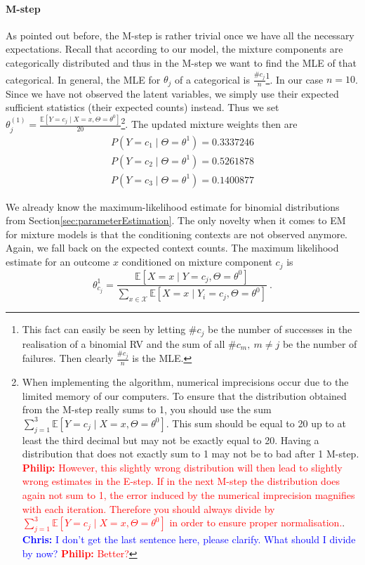 \documentclass[a4paper,11pt,leqno]{report}\usepackage[]{graphicx}\usepackage[]{color}
\newcommand{\E}{\mathbb{E}}
\newcommand{\philip}[1]{ \textcolor{red}{\textbf{Philip:} #1}}
\newcommand{\chris}[1]{ \textcolor{blue}{\textbf{Chris:} #1}}
\begin{document}
\paragraph{M-step} As pointed out before, the M-step is rather trivial once we have all the necessary expectations. Recall that according to our model, 
the mixture components are categorically
distributed and thus in the M-step we want to find the MLE of that categorical. In general, the MLE for $ \theta_{j} $ of a categorical is
$ \frac{\#c_{j}}{n} $\footnote{This fact can easily be seen by letting $ \#c_{j} $ be the number of successes in the realisation of a binomial RV and the sum of all
$ \#c_{m},~m \not = j $ be the number of failures. Then clearly $ \frac{\#c_{j}}{n} $ is the MLE.}. In our case $ n=10 $. Since we have not observed the
latent variables, we simply use their expected sufficient statistics (their expected counts) instead. Thus we set 
$ \theta_{j}^{(1)} = \frac{\E[Y = c_{j} \mid X=x,\Theta= \theta^{0}]}{20} $\footnote{When implementing the algorithm, numerical imprecisions occur due to the limited
memory of our computers. To ensure that the distribution obtained from the M-step really sums to 1, you should use the sum 
$ \sum_{j=1}^{3} \E[Y = c_{j} \mid X=x,\Theta= \theta^{0}] $. This sum should be equal to 20 up to at least the third decimal but may not be exactly equal to
20. Having a distribution that does not exactly sum to 1 may not be to bad after 1 M-step. \philip{However, this slightly wrong distribution will then lead to slightly wrong estimates in the E-step. If in the next M-step the distribution does again not sum to 1, the error induced by the numerical imprecision magnifies with each iteration. Therefore you should always divide by $ \sum_{j=1}^{3} \E[Y = c_{j} \mid X=x,\Theta= \theta^{0}] $ in order to ensure proper normalisation.}.\chris{I don't get the last sentence here, please clarify. What should I divide by now?}\philip{Better?}}. The updated mixture weights then are 
\begin{align}
P(Y=c_{1} \mid \Theta= \theta^{1}) = 0.3337246 \\
P(Y=c_{2} \mid \Theta= \theta^{1}) = 0.5261878 \nonumber \\
P(Y=c_{3} \mid \Theta= \theta^{1}) = 0.1400877 \nonumber
\end{align}

We already know the maximum-likelihood estimate for binomial distributions from 
Section\ref{sec:parameterEstimation}. The only novelty when it comes to EM for mixture models
is that the conditioning contexts are not observed anymore. Again, we fall back on the expected
context counts. The maximum likelihood estimate for an outcome $ x $ conditioned on
mixture component $ c_{j} $ is
\begin{equation}
\theta^{1}_{c_{j}} = \frac{\E[X=x \mid Y=c_{j},\Theta=\theta^{0}]}{\sum_{x \in \mathcal{X}}\E[X=x \mid Y_{i}=c_{j},\Theta=\theta^{0}]}\ .
\end{equation}
\end{document}
